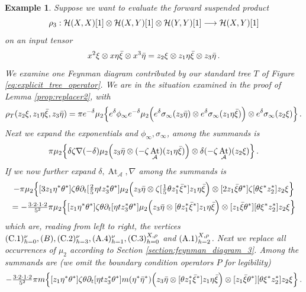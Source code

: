 \documentclass[english,letter paper,12pt,leqno]{article}
\theoremstyle{example}
\newtheorem{example}[theorem]{Example}
\numberwithin{equation}{section}
\def\AA{\mathcal{A}}
\def\HH{\HH}
\def\HH{\mathcal{H}}
\DeclareMathOperator{\vAt}{At}
\begin{document}
\begin{example}
Suppose we want to evaluate the forward suspended product
\[
\rho_3: \HH(X,X)[1] \otimes \HH(X,Y)[1] \otimes \HH(Y,Y)[1] \lto \HH(X,Y)[1]
\]
on an input tensor
\[
x^2 \xi \otimes x \eta \Bar{\xi} \otimes x^3 \Bar{\eta} = z_2 \xi \otimes z_1 \eta \Bar{\xi} \otimes z_3 \Bar{\eta}\,.
\]
We examine one Feynman diagram contributed by our standard tree $T$ of Figure \ref{eq:explicit_tree_operator}. We are in the situation examined in the proof of Lemma \ref{prop:replacer2}, with
\[
\rho_T( z_2 \xi, z_1 \eta \Bar{\xi}, z_3 \Bar{\eta} ) = \pi e^{-\delta} \mu_2\Big\{ e^{\delta} \phi_\infty e^{-\delta} \mu_2\Big( e^\delta \sigma_\infty( z_3 \Bar{\eta} ) \otimes e^\delta \sigma_\infty( z_1 \eta \Bar{\xi} ) \Big) \otimes e^\delta\sigma_\infty( z_2 \xi ) \Big\}\,.
\]
Next we expand the exponentials and $\phi_\infty, \sigma_\infty$, among the summands is
\begin{align*}
\pi \mu_2\Big\{ \delta \zeta \nabla (-\delta) \mu_2\Big( z_3 \Bar{\eta} \otimes (-\zeta \vAt_{\AA})( z_1\eta \Bar{\xi} ) \Big) \otimes \delta (-\zeta \vAt_{\AA})( z_2 \xi ) \Big\}\,.
\end{align*}
If we now further expand $\delta, \vAt_{\AA}, \nabla$ among the summands is
\begin{gather*}
- \pi \mu_2\Big\{ [ 3 z_1 \eta^* \theta^* ] \zeta \theta \partial_t [ \tfrac{2}{5} \eta t z_3^* \theta^* ] \mu_2\Big( z_3 \Bar{\eta} \otimes \zeta [\tfrac{1}{5} \theta z_1^* \Bar{\xi}^*] z_1 \eta \Bar{\xi}\Big) \otimes [2z_1 \Bar{\xi} \theta^*] \zeta [\theta \xi^* z_2^*] z_2 \xi \Big\}\\
= - \tfrac{3 \cdot 2 \cdot 1 \cdot 2}{5^2} \pi \mu_2\Big\{ [ z_1 \eta^* \theta^* ] \zeta \theta \partial_t [ \eta t z_3^* \theta^* ] \mu_2\Big( z_3 \Bar{\eta} \otimes [ \theta z_1^* \Bar{\xi}^*] z_1 \eta \Bar{\xi}\Big) \otimes [z_1 \Bar{\xi} \theta^*] [\theta \xi^* z_2^*] z_2 \xi \Big\}
\end{gather*}
which are, reading from left to right, the vertices $(\textup{C}.1)^\nu_{h=0}, (B), (\textup{C}.2)^{\nu}_{h=3}, (\textup{A}.4)^\nu_{h=1}, (\textup{C}.3)^{X,\rho}_{h=0}$ and $(\textup{A}.1)^{X,\rho}_{h=2}$. Next we replace all occurrences of $\mu_2$ according to Section \ref{section:feynman_diagram_3}. Among the summands are (we omit the boundary condition operators $P$ for legibility)
\begin{gather*}
- \tfrac{3 \cdot 2 \cdot 1 \cdot 2}{5^2} \pi m\Big\{ [ z_1 \eta^* \theta^* ] \zeta \theta \partial_t [ \eta t z_3^* \theta^* ] m ( \eta^* \Bar{\eta}^* ) \Big( z_3 \Bar{\eta} \otimes [ \theta z_1^* \Bar{\xi}^*] z_1 \eta \Bar{\xi}\Big) \otimes [z_1 \Bar{\xi} \theta^*] [\theta \xi^* z_2^*] z_2 \xi \Big\}\,.

\end{gather*}
\end{example}
\end{document}
